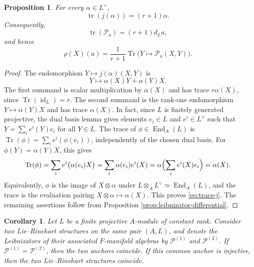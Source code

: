 \documentclass[12pt,reqno]{amsart}
\newtheorem{proposition}[theorem]{Proposition}
\newtheorem{corollary}[theorem]{Corollary}
\theoremstyle{definition}
\theoremstyle{remark}
\newcommand{\id}{\operatorname{id}}
\newcommand{\tr}{\operatorname{tr}}
\newcommand{\Pcal}{\mathcal P}
\begin{document}
	\begin{proposition}\label{prop:trace-formula}
		For every $\alpha\in L^\vee$,
		\begin{equation}\label{eq:trace-j}
			\tr(j(\alpha))=(r+1)\alpha.
		\end{equation}
		Consequently,
		\begin{equation}\label{eq:trace-P}
			\tr(\Pcal_a)=(r+1)d_La,
		\end{equation}
		and hence
		\begin{equation}\label{eq:anchor-trace-formula}
			\rho(X)(a)=\frac1{r+1}\operatorname{Tr}\bigl(Y\mapsto \Pcal_a(X,Y)\bigr).
		\end{equation}
	\end{proposition}
	
	\begin{proof}
		The endomorphism $Y\mapsto j(\alpha)(X,Y)$ is
		\[
		Y\mapsto \alpha(X)Y+\alpha(Y)X.
		\]
		The first summand is scalar multiplication by $\alpha(X)$ and has trace
		$r\alpha(X)$, since $\operatorname{Tr}(\id_L)=r$.  The second summand is
		the rank-one endomorphism $Y\mapsto \alpha(Y)X$ and has trace
		$\alpha(X)$.  In fact, since $L$ is finitely generated projective, the dual
		basis lemma gives elements $e_i\in L$ and $e^i\in L^\vee$ such that
		$Y=\sum_i e^i(Y)e_i$ for all $Y\in L$.  The trace of
		$\phi\in\operatorname{End}_A(L)$ is
		$\operatorname{Tr}(\phi)=\sum_i e^i(\phi(e_i))$, independently of the
		chosen dual basis.  For $\phi(Y)=\alpha(Y)X$, this gives
		\[
		\operatorname{Tr}(\phi)
		=\sum_i e^i\bigl(\alpha(e_i)X\bigr)
		=\sum_i \alpha(e_i)e^i(X)
		=\alpha\Bigl(\sum_i e^i(X)e_i\Bigr)
		=\alpha(X).
		\]
		Equivalently, $\phi$ is the image of $X\otimes\alpha$ under
		$L\otimes_A L^\vee\simeq\operatorname{End}_A(L)$, and the trace is the
		evaluation pairing $X\otimes\alpha\mapsto\alpha(X)$.  This proves
		\eqref{eq:trace-j}.  The remaining assertions follow from
		Proposition \ref{prop:leibnizator-differential}.
	\end{proof}
	
	\begin{corollary}\label{cor:faithful-rigidity}
		Let $L$ be a finite projective $A$-module of constant rank.  Consider two
		Lie--Rinehart structures on the same pair $(A,L)$, and denote the
		Leibnizators of their associated $F$-manifold algebras by $\Pcal^{(1)}$ and
		$\Pcal^{(2)}$.  If $\Pcal^{(1)}=\Pcal^{(2)}$, then the two anchors coincide.
		If this common anchor is injective, then the two Lie--Rinehart structures
		coincide.
	\end{corollary}
	
\end{document}
